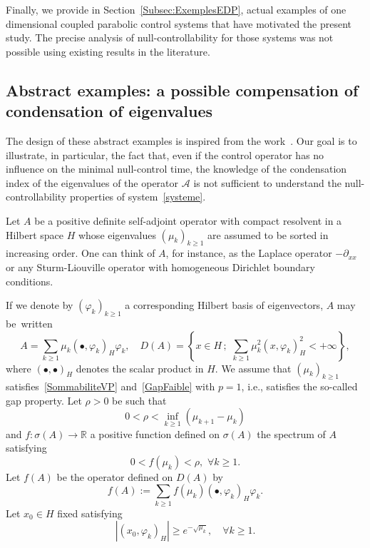 \documentclass[10pt]{amsart}
\theoremstyle{definition}\newtheorem{defi}[theo]{Definition}\newtheorem{rema}[theo]{Remark}\newtheorem{exam}[theo]{Example}\newtheorem{exem}[theo]{Example}\newtheorem{nota}[theo]{Notation}
\newcommand\A{\mathcal{A}}
\newcommand{\psH}[2]{\left(#1, #2 \right)_H}
\renewcommand{\cdot}{{\scriptstyle \bullet}}
\let\oldforall\forall
\renewcommand*{\forall}{\mathrel{\oldforall}}
\begin{document}
Finally, we provide in Section~\ref{Subsec:ExemplesEDP}, actual examples of one dimensional coupled parabolic control systems that have motivated the present study. The precise analysis of null-controllability for those systems was not possible using existing results in the literature.


\subsection{Abstract examples: a possible compensation of condensation of eigenvalues} \label{Subsec:ExemplesAcademiques}

The design of these abstract examples is inspired from the work~\cite{AKBDK05}. Our goal is to illustrate, in particular, the fact that, even if the control operator has no influence on the minimal null-control time, the knowledge of the condensation index of the eigenvalues of the operator $\A$ is not sufficient to understand the null-controllability properties of system~\eqref{systeme}.

Let $A$ be a positive definite self-adjoint operator with compact resolvent in a Hilbert space $H$ whose eigenvalues $(\mu _{k})_{k \geq 1}$ are assumed to be sorted in increasing order. One can think of $A$, for instance, as the Laplace operator $-\partial_{xx} $ or any Sturm-Liouville operator with homogeneous Dirichlet boundary conditions.

If we denote by $(\varphi _{k})_{k \geq 1}$ a corresponding Hilbert basis of eigenvectors, $A$ may be~written
\begin{equation*}
A=\sum_{k \geq 1} \mu_{k} \psH{\cdot}{\varphi_{k}} \varphi_{k}, \quad D(A)=\left\{x\in H \,;\,\, \sum_{k\geq 1}\mu_k^2 \psH{x}{\varphi_k}^2<+\infty\right\},
\end{equation*}
where $\psH{\cdot}{\cdot}$ denotes the scalar product in $H$. We assume that $(\mu_k)_{k \geq 1}$ satisfies~\eqref{SommabiliteVP} and~\eqref{GapFaible} with $p=1$, i.e., satisfies the so-called gap property. Let $\rho >0$ be such that
\begin{equation}\label{hyporho}
0 < \rho < \inf_{k \geq 1} (\mu_{k+1}- \mu_k)
\end{equation}
and $f:\sigma(A)\rightarrow \mathbb{R}$ a positive function defined on $\sigma(A)$ the spectrum of $A$ satisfying
\begin{equation}\label{hypof}
0<f(\mu_k)<\rho, \,\,\forall k\geq 1.
\end{equation}
Let $f(A)$ be the operator defined on $D(A)$ by
\begin{equation*}
f(A):=\sum_{k\geq 1}f(\mu _{k}) \psH{\cdot}{\varphi _{k} } \varphi _{k}.
\end{equation*}
Let $x_0\in H$ fixed satisfying
\begin{equation}\label{hypox0}
| \psH{x_0}{\varphi_k}| \geq e^{-\sqrt{\mu_k}},\quad \forall k\geq 1.
\end{equation}
\end{document}
